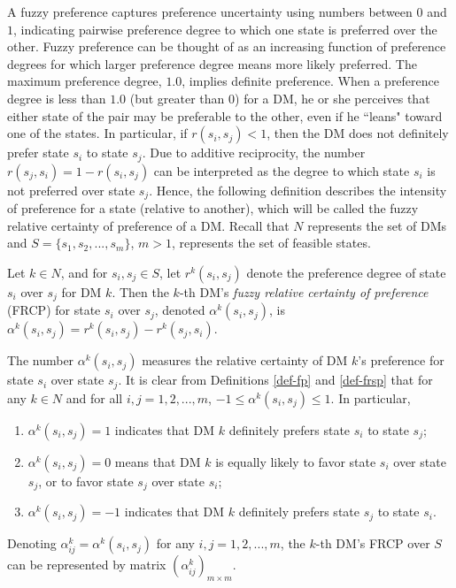 A fuzzy preference captures preference uncertainty using numbers between $0$ and $1$, indicating pairwise preference degree to which one state is preferred over the other. Fuzzy preference can be thought of as an increasing function of preference degrees for which larger preference degree means more likely preferred. The maximum preference degree, $1.0$, implies definite preference. When a preference degree is less than $1.0$ (but greater than 0) for a DM, he or she perceives that either state of the pair may be preferable to the other, even if he ``leans" toward one of the states. In particular, if $r(s_i, s_j)<1$, then the DM does not definitely prefer state $s_i$ to state $s_j$. Due to additive reciprocity, the number $r(s_j, s_i)=1-r(s_i, s_j)$ can be interpreted as the degree to which state $s_i$ is not preferred over state $s_j$. Hence, the following definition describes the intensity of preference for a state (relative to another), which will be called the fuzzy relative certainty of preference of a DM. Recall that $N$ represents the set of DMs and $S=\{s_1, s_2, ..., s_m\}$, $m>1$, represents the set of feasible states.

\begin{definition} \label{def-frsp}
\rm Let $k\in N$, and for $s_i, s_j \in S$, let $r^k(s_i, s_j)$ denote the preference degree of state $s_i$ over $s_j$ for DM $k$. Then the $k$-th DM's \emph{fuzzy relative certainty of preference} (FRCP) for state $s_i$ over $s_j$, denoted $\alpha^k(s_i, s_j)$, is $\alpha^k(s_i, s_j) = r^k(s_i, s_j)-r^k(s_j, s_i).$
\end{definition}
\noindent The number $\alpha^k(s_i, s_j)$ measures the relative certainty of DM $k$'s preference for state $s_i$ over state $s_j$. It is clear from Definitions \ref{def-fp} and \ref{def-frsp} that for any $k \in N$ and for all $i, j = 1, 2, ..., m$, $-1 \leq \alpha^k(s_i, s_j) \leq 1$. In particular,
\begin{enumerate}[(1)]
\item $\alpha^k(s_i, s_j) = 1$ indicates that DM $k$ definitely prefers state $s_i$ to state $s_j$;
\item $\alpha^k(s_i, s_j) = 0$ means that DM $k$ is equally likely to favor state $s_i$ over state $s_j$, or to favor state $s_j$ over state $s_i$;
\item $\alpha^k(s_i, s_j) = -1$ indicates that DM $k$ definitely prefers state $s_j$ to state $s_i$.
\end{enumerate}

Denoting $\alpha_{ij}^k=\alpha^k(s_i, s_j)$ for any $i, j = 1, 2, ..., m$, the $k$-th DM's FRCP over $S$ can be represented by matrix $(\alpha_{ij}^k)_{m \times m}$.

